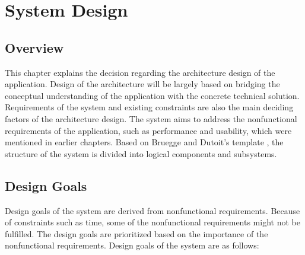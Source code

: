 \chapter{System Design}


\section{Overview}


This chapter explains the decision regarding the architecture design of the application.
Design of the architecture will be largely based on bridging the conceptual understanding of the application with the concrete technical solution.
Requirements of the system and existing constraints are also the main deciding factors of the architecture design.
The system aims to address the nonfunctional requirements of the application, such as performance and usability, which were mentioned in earlier chapters.
Based on Bruegge and Dutoit's template \cite{bruegge2004object}, the structure of the system is divided into logical components and subsystems.

\section{Design Goals}


Design goals of the system are derived from nonfunctional requirements.
Because of constraints such as time, some of the nonfunctional requirements might not be fulfilled.
The design goals are prioritized based on the importance of the nonfunctional requirements.
Design goals of the system are as follows:

